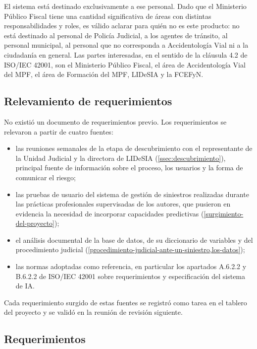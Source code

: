 El sistema está destinado exclusivamente a ese personal. Dado que el Ministerio Público Fiscal tiene una cantidad significativa de áreas con distintas responsabilidades y roles, es válido aclarar para quién no es este producto: no está destinado al personal de Policía Judicial, a los agentes de tránsito, al personal municipal, al personal que no corresponda a Accidentología Vial ni a la ciudadanía en general. Las partes interesadas, en el sentido de la cláusula 4.2 de ISO/IEC 42001, son el Ministerio Público Fiscal, el área de Accidentología Vial del MPF, el área de Formación del MPF, LIDeSIA y la FCEFyN.

\subsection{Relevamiento de requerimientos}\label{ssec:relevamiento}

No existió un documento de requerimientos previo. Los requerimientos se relevaron a partir de cuatro fuentes:

\begin{itemize}[itemsep=2pt]
  \item las reuniones semanales de la etapa de descubrimiento con el representante de la Unidad Judicial y la directora de LIDeSIA (\cref{ssec:descubrimiento}), principal fuente de información sobre el proceso, los usuarios y la forma de comunicar el riesgo;
  \item las pruebas de usuario del sistema de gestión de siniestros realizadas durante las prácticas profesionales supervisadas de los autores, que pusieron en evidencia la necesidad de incorporar capacidades predictivas (\cref{surgimiento-del-proyecto});
  \item el análisis documental de la base de datos, de su diccionario de variables y del procedimiento judicial (\cref{procedimiento-judicial-ante-un-siniestro,los-datos});
  \item las normas adoptadas como referencia, en particular los apartados A.6.2.2 y B.6.2.2 de ISO/IEC 42001 sobre requerimientos y especificación del sistema de IA.
\end{itemize}

Cada requerimiento surgido de estas fuentes se registró como tarea en el tablero del proyecto y se validó en la reunión de revisión siguiente.

\subsection{Requerimientos}\label{ssec:requerimientos}

